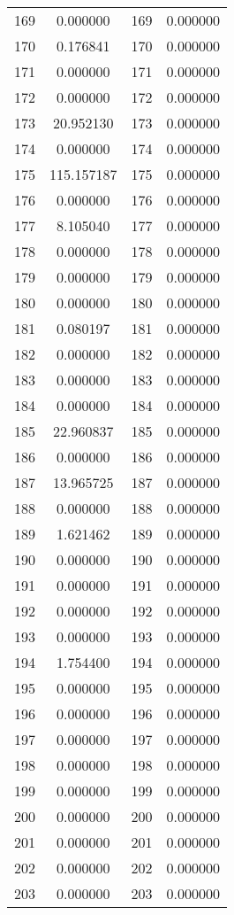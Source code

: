 \documentclass[12pt]{article}
\begin{document}
\begin{longtable}{@{}cccc@{}}
169 & 0.000000 & 169 & 0.000000 \\
170 & 0.176841 & 170 & 0.000000 \\
171 & 0.000000 & 171 & 0.000000 \\
172 & 0.000000 & 172 & 0.000000 \\
173 & 20.952130 & 173 & 0.000000 \\
174 & 0.000000 & 174 & 0.000000 \\
175 & 115.157187 & 175 & 0.000000 \\
176 & 0.000000 & 176 & 0.000000 \\
177 & 8.105040 & 177 & 0.000000 \\
178 & 0.000000 & 178 & 0.000000 \\
179 & 0.000000 & 179 & 0.000000 \\
180 & 0.000000 & 180 & 0.000000 \\
181 & 0.080197 & 181 & 0.000000 \\
182 & 0.000000 & 182 & 0.000000 \\
183 & 0.000000 & 183 & 0.000000 \\
184 & 0.000000 & 184 & 0.000000 \\
185 & 22.960837 & 185 & 0.000000 \\
186 & 0.000000 & 186 & 0.000000 \\
187 & 13.965725 & 187 & 0.000000 \\
188 & 0.000000 & 188 & 0.000000 \\
189 & 1.621462 & 189 & 0.000000 \\
190 & 0.000000 & 190 & 0.000000 \\
191 & 0.000000 & 191 & 0.000000 \\
192 & 0.000000 & 192 & 0.000000 \\
193 & 0.000000 & 193 & 0.000000 \\
194 & 1.754400 & 194 & 0.000000 \\
195 & 0.000000 & 195 & 0.000000 \\
196 & 0.000000 & 196 & 0.000000 \\
197 & 0.000000 & 197 & 0.000000 \\
198 & 0.000000 & 198 & 0.000000 \\
199 & 0.000000 & 199 & 0.000000 \\
200 & 0.000000 & 200 & 0.000000 \\
201 & 0.000000 & 201 & 0.000000 \\
202 & 0.000000 & 202 & 0.000000 \\
203 & 0.000000 & 203 & 0.000000 \\

\end{longtable}
\end{document}
